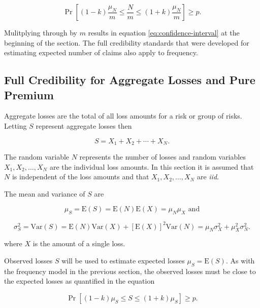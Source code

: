 \documentclass[]{book}
\theoremstyle{definition}
\theoremstyle{definition}
\theoremstyle{definition}
\theoremstyle{remark}
\begin{document}
\begin{equation*}
\Pr\left[(1-k)\frac{\mu_N}{m}\leq \frac{N}{m} \leq(1+k)\frac{\mu_N}{m}\right] \geq p.
\end{equation*}

Mulitplying through by \(m\) results in equation
\eqref{eq:confidence-interval} at the beginning of the section. The full
credibility standards that were developed for estimating expected number
of claims also apply to frequency.

\subsection{Full Credibility for Aggregate Losses and Pure
Premium}\label{full-credibility-for-aggregate-losses-and-pure-premium}

Aggregate losses are the total of all loss amounts for a risk or group
of risks. Letting \(S\) represent aggregate losses then

\begin{equation*}
S=X_1+X_2+\cdots+X_N.
\end{equation*}

The random variable \(N\) represents the number of losses and random
variables \(X_1, X_2,\ldots,X_N\) are the individual loss amounts. In
this section it is assumed that \(N\) is independent of the loss amounts
and that \(X_1, X_2,\ldots,X_N\) are \emph{iid}.

The mean and variance of \(S\) are

\begin{equation*}
\mu_S=\mathrm{E}(S)=\mathrm{E}(N)\mathrm{E}(X)=\mu_N\mu_X\textrm{  and}
\end{equation*}

\begin{equation*}
\sigma^{2}_S=\mathrm{Var}(S)=\mathrm{E}(N)\mathrm{Var}(X)+[\mathrm{E}(X)]^{2}\mathrm{Var}(N)=\mu_N\sigma^{2}_X+\mu^{2}_X\sigma^{2}_N.
\end{equation*}

where \(X\) is the amount of a single loss.

Observed losses \(S\) will be used to estimate expected losses
\(\mu_S=\mathrm{E}(S)\). As with the frequency model in the previous
section, the observed losses must be close to the expected losses as
quantified in the equation

\begin{equation*}
\Pr[(1-k)\mu_S\leq S \leq(1+k)\mu_S] \geq p.
\end{equation*}
\end{document}
